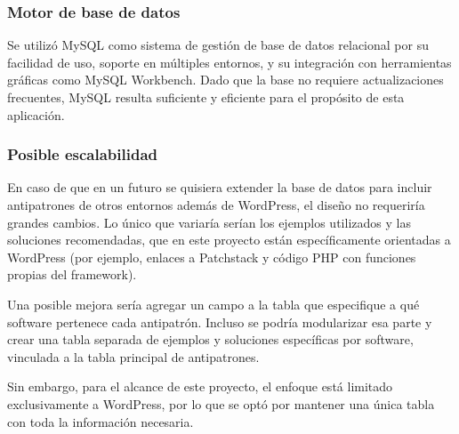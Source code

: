 \subsubsection{Motor de base de datos}

Se utilizó MySQL como sistema de gestión de base de datos relacional por su facilidad de uso, soporte en múltiples entornos, y su integración con herramientas gráficas como MySQL Workbench. Dado que la base no requiere actualizaciones frecuentes, MySQL resulta suficiente y eficiente para el propósito de esta aplicación.



\subsubsection{Posible escalabilidad}

En caso de que en un futuro se quisiera extender la base de datos para incluir antipatrones de otros entornos además de WordPress, el diseño no requeriría grandes cambios. Lo único que variaría serían los ejemplos utilizados y las soluciones recomendadas, que en este proyecto están específicamente orientadas a WordPress (por ejemplo, enlaces a Patchstack y código PHP con funciones propias del framework).

Una posible mejora sería agregar un campo a la tabla que especifique a qué software pertenece cada antipatrón. Incluso se podría modularizar esa parte y crear una tabla separada de ejemplos y soluciones específicas por software, vinculada a la tabla principal de antipatrones.

Sin embargo, para el alcance de este proyecto, el enfoque está limitado exclusivamente a WordPress, por lo que se optó por mantener una única tabla con toda la información necesaria.